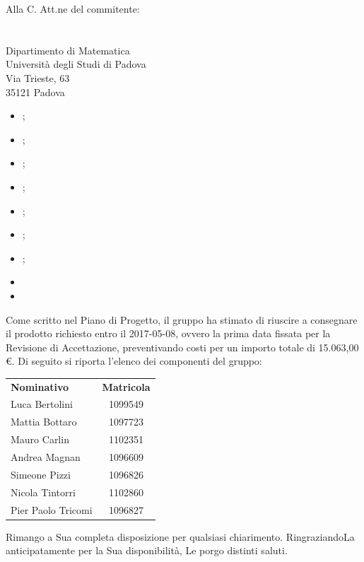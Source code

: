 \documentclass[a4paper,titlepage]{letteracdp}
\begin{document}
\begin{letter}{
    Alla C. Att.ne del commitente: \\
    \COMMITTENTE \\
    \CARDIN      \\
    Dipartimento di Matematica \\
		Università degli Studi di Padova \\
		Via Trieste, 63 \\
		35121 Padova}
    \begin{itemize}
      \item \Gldoc{} \Glfile{};
      \item \NPdoc{} \NPfile{};
      \item \SFdoc{} \SFfile{};
      \item \PPdoc{} \PPfile{};
      \item \PQdoc{} \PQfile{};
      \item \ARdoc{} \ARfile{};
      \item \SDKdoc{} \SDKfile{};
      \item {} 
      \item {} 
    \end{itemize}
    Come scritto nel Piano di Progetto, il gruppo ha stimato di riuscire a
    consegnare il prodotto richiesto entro il 2017-05-08, ovvero la prima data
    fissata per la Revisione di Accettazione, preventivando costi per un importo
    totale di 15.063,00 \euro.
    \newpage
    Di seguito si riporta l'elenco dei componenti del gruppo:\\
    \begin{center}
      \begin{tabular}{l c}
        \textbf{Nominativo} & \textbf{Matricola} \\
        Luca Bertolini 	 	& 1099549  \\
        Mattia Bottaro 	 	& 1097723  \\
        Mauro Carlin 	 	& 1102351  \\
        Andrea Magnan    	& 1096609  \\
        Simeone Pizzi    	& 1096826  \\
        Nicola Tintorri    	& 1102860  \\
        Pier Paolo Tricomi 	& 1096827  \\
      \end{tabular}
    \end{center}
    \closing{Rimango a Sua completa disposizione per qualsiasi chiarimento.
		RingraziandoLa anticipatamente per la Sua disponibilità, Le porgo distinti saluti.}
  \end{letter}
\end{document}
